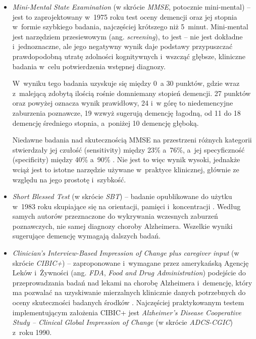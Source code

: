 \begin{itemize}

  \item \emph{Mini-Mental State Examination} (w skrócie \emph{MMSE}, potocznie mini-mental) -- jest to zaprojektowany w~1975 roku test oceny demencji oraz jej stopnia w~formie szybkiego badania, najczęściej krótszego niż 5~minut.
        Mini-mental jest narzędziem przesiewowym (ang. \emph{screening}), to jest -- nie jest dokładne i~jednoznaczne, ale jego negatywny wynik daje podstawy przypuszczać prawdopodobną utratę zdolności kognitywnych i~wszcząć
        głębsze, kliniczne badania w~celu potwierdzenia wstępnej diagnozy.

        W~wyniku tego badania uzyskuje się między 0~a 30 punktów, gdzie wraz z~malejącą zdobytą ilością rośnie domniemany stopień demencji.
        27 punktów oraz powyżej oznacza wynik prawidłowy, 24 i~w górę to niedemencyjne zaburzenia poznawcze, 19 wzwyż sugerują demencję łagodną, od 11 do 18 demencję średniego stopnia, a~poniżej 10 demencję głęboką.

        Niedawne badania nad skutecznością MMSE na przestrzeni różnych kategorii stwierdzały jej czułość (sensitivity) między 23\% a~76\%, a~jej specyficzność (specificity) między 40\% a~90\% \cite{arevalo2015mini}.
        Nie jest to więc wynik wysoki, jednakże wciąż jest to istotne narzędzie używane w~praktyce klinicznej, głównie ze względu na jego prostotę i~szybkość.

  \item \emph{Short Blessed Test} (w skrócie \emph{SBT}) -- badanie opublikowane do użytku w~1983 roku skupiające się na orientacji, pamięci i~koncentracji \cite{katzman1983validation}.
        Według samych autorów przeznaczone do wykrywania wczesnych zaburzeń poznawczych, nie samej diagnozy choroby Alzheimera.
        Wszelkie wyniki sugerujące demencję wymagają dalszych badań.

  \item \emph{Clinician's Interview-Based Impression of Change plus caregiver input} (w skrócie \emph{CIBIC+}) -- zaproponowane i~wymagane przez amerykańską Agencję Leków i~Żywności (ang. \emph{FDA}, \emph{Food and Drug Administration}) podejście do przeprowadzania badań nad lekami na chorobę Alzheimera i~demencję, który ma pozwalać na uzyskiwanie mierzalnych klinicznie danych potrzebnych do oceny skuteczności badanych środków \cite{joffres2000qualitative}.
        Najczęściej praktykowanym testem implementującym założenia CIBIC+ jest \emph{Alzheimer's Disease Cooperative Study -- Clinical Global Impression of Change} (w skrócie \emph{ADCS-CGIC}) z~roku 1990.


\end{itemize}
